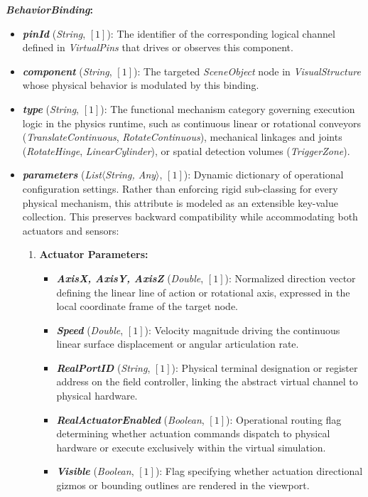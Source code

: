 \textbf{\textit{BehaviorBinding}:}
\begin{itemize}
    \item \textbf{\textit{pinId}} (\textit{String}, $[1]$): The identifier of the corresponding logical channel defined in \textit{VirtualPins} that drives or observes this component.
    \item \textbf{\textit{component}} (\textit{String}, $[1]$): The targeted \textit{SceneObject} node in \textit{VisualStructure} whose physical behavior is modulated by this binding.
    \item \textbf{\textit{type}} (\textit{String}, $[1]$): The functional mechanism category governing execution logic in the physics runtime, such as continuous linear or rotational conveyors (\textit{TranslateContinuous}, \textit{RotateContinuous}), mechanical linkages and joints (\textit{RotateHinge}, \textit{LinearCylinder}), or spatial detection volumes (\textit{TriggerZone}).
    \item \textbf{\textit{parameters}} (\textit{List$\langle$String, Any$\rangle$}, $[1]$): Dynamic dictionary of operational configuration settings. Rather than enforcing rigid sub-classing for every physical mechanism, this attribute is modeled as an extensible key-value collection. This preserves backward compatibility while accommodating both actuators and sensors:
    \begin{enumerate}
        \item \textbf{Actuator Parameters:}
        \begin{itemize}
            \item \textbf{\textit{AxisX, AxisY, AxisZ}} (\textit{Double}, $[1]$): Normalized direction vector defining the linear line of action or rotational axis, expressed in the local coordinate frame of the target node.
            \item \textbf{\textit{Speed}} (\textit{Double}, $[1]$): Velocity magnitude driving the continuous linear surface displacement or angular articulation rate.
            \item \textbf{\textit{RealPortID}} (\textit{String}, $[1]$): Physical terminal designation or register address on the field controller, linking the abstract virtual channel to physical hardware.
            \item \textbf{\textit{RealActuatorEnabled}} (\textit{Boolean}, $[1]$): Operational routing flag determining whether actuation commands dispatch to physical hardware or execute exclusively within the virtual simulation.
            \item \textbf{\textit{Visible}} (\textit{Boolean}, $[1]$): Flag specifying whether actuation directional gizmos or bounding outlines are rendered in the viewport.
        \end{itemize}


\end{enumerate}
\end{itemize}
